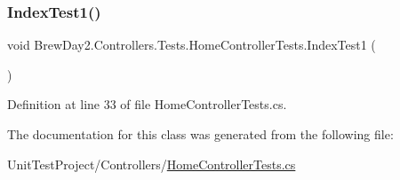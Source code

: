 \subsubsection{\texorpdfstring{Index\+Test1()}{IndexTest1()}}
{\footnotesize\ttfamily void Brew\+Day2.\+Controllers.\+Tests.\+Home\+Controller\+Tests.\+Index\+Test1 (\begin{DoxyParamCaption}{ }\end{DoxyParamCaption})}



Definition at line 33 of file Home\+Controller\+Tests.\+cs.



The documentation for this class was generated from the following file\+:\begin{DoxyCompactItemize}
\item 
Unit\+Test\+Project/\+Controllers/\mbox{\hyperlink{_home_controller_tests_8cs}{Home\+Controller\+Tests.\+cs}}\end{DoxyCompactItemize}
